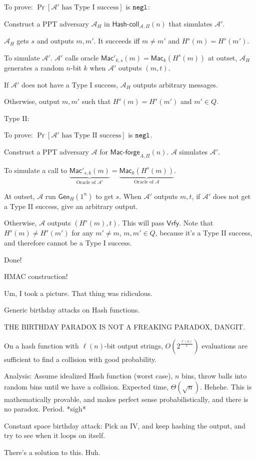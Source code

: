 \documentclass[12pt]{article}
\newcommand{\AAA}{\mathcal{A}}
\newcommand{\Mac}{\mathsf{Mac}}
\newcommand{\Macf}{\mathsf{Mac\text{-}forge}}
\newcommand{\Vrfy}{\mathsf{Vrfy}}
\newcommand{\Gen}{\mathsf{Gen}}
\newcommand{\ExptHCArgs}[2]{\mathsf{Hash\text{-}coll}_{#1,#2}}
\newcommand{\ExptHC}{\ExptHCArgs{\AAA}{\Pi}}
\newcommand{\negl}{{\tt negl}}
\begin{document}
To prove: $\Pr[\AAA'\text{ has Type I success}]$ is $\negl$:

Construct a PPT adversary $\AAA_H$ in $\ExptHC(n)$ that simulates $\AAA'$.

$\AAA_H$ gets $s$ and outputs $m,m'$. It succeeds iff $m\neq m'$ and $H^s(m)=H^s(m')$.

To simulate $\AAA'$. $\AAA'$ calls oracle $\Mac'_{k,s}(m)=\Mac_k(H^s(m))$ at outset, $\AAA_H$ generates a random $n$-bit $k$ when $\AAA'$ outputs $(m,t)$.

If $\AAA'$ does not have a Type I success, $\AAA_H$ outputs arbitrary messages.

Otherwise, output $m,m'$ such that $H^s(m)=H^s(m')$ and $m'\in Q$.

Type II:

To prove: $\Pr[\AAA'\text{ has Type II success}]$ is $\negl$.

Construct a PPT adversary $\AAA$ for $\Macf_{A,\Pi}(n)$. $\AAA$ simulates $\AAA'$.

To simulate a call to $\underbrace{\Mac'_{s,k}(m)}_{\text{Oracle of }\AAA'}=\underbrace{\Mac_k(H^s(m))}_{\text{Oracle of }\AAA}$.

At outset, $\AAA$ run $\Gen_H(1^n)$ to get $s$. When $\AAA'$ outputs $m,t$, if $\AAA'$ does not get a Type II success, give an arbitrary output.

Otherwise, $\AAA$ outputs $\left(H^s(m),t\right)$. This will pass $\Vrfy$. Note that $H^s(m)\neq H^s(m')$ for any $m'\neq m$, $m,m'\in Q$, because it's a Type II success, and therefore cannot be a Type I success.

Done!

HMAC construction!

Um, I took a picture. That thing was ridiculous.

Generic birthday attacks on Hash functions.

THE BIRTHDAY PARADOX IS NOT A FREAKING PARADOX, DANGIT.

On a hash function with $\ell(n)$-bit output strings, $O(2^{\frac{\ell(n)}{2}})$ evaluations are sufficient to find a collision with good probability.

Analysis: Assume idealized Hash function (worst case), $n$ bins, throw balls into random bins until we have a collision. Expected time, $\Theta(\sqrt{n})$. Hehehe. This is mathematically provable, and makes perfect sense probabilistically, and there is no paradox. Period. *sigh*

Constant space birthday attack: Pick an IV, and keep hashing the output, and try to see when it loops on itself.

There's a solution to this. Huh.
\end{document}
